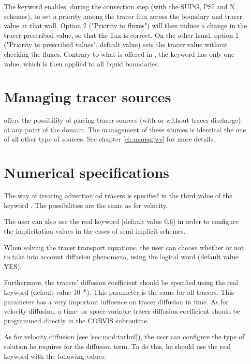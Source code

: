  The keyword  enables, during the convection step (with the SUPG, PSI and N schemes), to set a priority among the tracer flux across the boundary and tracer value at that wall. Option 2 ("Priority to fluxes") will then induce a change in the tracer prescribed value, so that the flux is correct. On the other hand, option 1 ("Priority to prescribed values", default value) sets the tracer value without checking the fluxes. Contrary to what is offered in , the  keyword has only one value, which is then applied to all liquid boundaries.


\section{Managing tracer sources}

  offers the possibility of placing tracer sources (with or without tracer discharge) at any point of the domain. The management of these sources is identical the one of all other type of sources. See chapter \ref{ch:manag:ws} for more details.


\section{ Numerical specifications}
\label{sec:num:spec}
 The way of treating advection od tracers is specified in the third value of the keyword . The possibilities are the same as for velocity.

 The user can also use the real keyword  (default value 0.6) in order to configure the implicitation values in the cases of semi-implicit schemes.

 When solving the tracer transport equations, the user can choose whether or not to take into account diffusion phenomena, using the logical word  (default value YES).

 Furthermore, the tracers' diffusion coefficient should be specified using the real keyword  (default value 10${}^{-6}$). This parameter is the same for all tracers. This parameter has a very important influence on tracer diffusion in time. As for velocity diffusion, a time- or space-variable tracer diffusion coefficient should be programmed directly in the CORVIS subroutine.

 As for velocity diffusion (see \ref{sec:mod:turbul}), the user can configure the type of solution he requires for the diffusion term. To do this, he should use the real keyword  with the following values:

